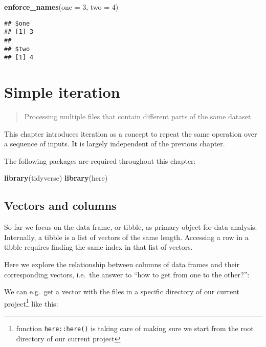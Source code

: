 \documentclass[]{book}
\newenvironment{Shaded}{\begin{snugshade}}{\end{snugshade}}
\newcommand{\DataTypeTok}[1]{\textcolor[rgb]{0.13,0.29,0.53}{#1}}
\newcommand{\DecValTok}[1]{\textcolor[rgb]{0.00,0.00,0.81}{#1}}
\newcommand{\KeywordTok}[1]{\textcolor[rgb]{0.13,0.29,0.53}{\textbf{#1}}}
\newcommand{\NormalTok}[1]{#1}
\let\rmarkdownfootnote\footnote%
\def\footnote{\protect\rmarkdownfootnote}
\begin{document}
\begin{enumerate}
\begin{Shaded}
\begin{Highlighting}[]
\KeywordTok{enforce_names}\NormalTok{(}\DataTypeTok{one =} \DecValTok{3}\NormalTok{, }\DataTypeTok{two =} \DecValTok{4}\NormalTok{)}
\end{Highlighting}
\end{Shaded}

\begin{verbatim}
## $one
## [1] 3
## 
## $two
## [1] 4
\end{verbatim}
\end{enumerate}

\hypertarget{simple-iteration}{%
\chapter{Simple iteration}\label{simple-iteration}}

\begin{quote}
Processing multiple files that contain different parts of the same dataset
\end{quote}

This chapter introduces iteration as a concept to repeat the same operation over a sequence of inputs.
It is largely independent of the previous chapter.

The following packages are required throughout this chapter:

\begin{Shaded}
\begin{Highlighting}[]
\KeywordTok{library}\NormalTok{(tidyverse)}
\KeywordTok{library}\NormalTok{(here)}
\end{Highlighting}
\end{Shaded}

\hypertarget{vectors-and-columns}{%
\section{Vectors and columns}\label{vectors-and-columns}}

So far we focus on the data frame, or tibble, as primary object for data analysis.
Internally, a tibble is a list of vectors of the same length.
Accessing a row in a tibble requires finding the same index in that list of vectors.

Here we explore the relationship between columns of data frames and their corresponding vectors, i.e.~the answer to ``how to get from one to the other?'':

We can e.g.~get a vector with the files in a specific directory of our current project\footnote{function \texttt{here::here()} is taking care of making sure we start from the root directory of our current project} like this:
\end{document}
